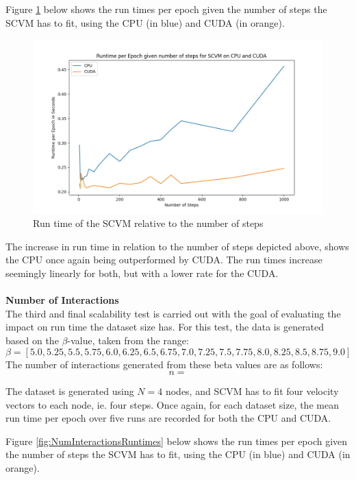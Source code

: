 Figure \ref{fig:NumStepsRuntimes} below shows the run times per epoch given the number of steps the SCVM has to fit, using the CPU (in blue) and CUDA (in orange).

\begin{figure}[H]
    \centering
    \includegraphics[width=\textwidth]{0_images/steps_runtime2.png}
    \caption{Run time of the SCVM relative to the number of steps}
    \label{fig:NumStepsRuntimes}
\end{figure}
The increase in run time in relation to the number of steps depicted above, shows the CPU once again being outperformed by CUDA.
The run times increase seemingly linearly for both, but with a lower rate for the CUDA.
\\\\
\textbf{Number of Interactions}
\\
The third and final scalability test is carried out with the goal of evaluating the impact on run time the dataset size has.
For this test, the data is generated based on the $\beta$-value, taken from the range:
\begin{equation}
    \beta = [5.0, 5.25, 5.5, 5.75, 6.0, 6.25, 6.5, 6.75, 7.0, 7.25, 7.5, 7.75, 8.0, 8.25, 8.5, 8.75, 9.0]
\end{equation}
The number of interactions generated from these beta values are as follows:
\begin{equation}
    n = 
\end{equation}

The dataset is generated using $N = 4$ nodes, and SCVM has to fit four velocity vectors to each node, ie. four steps.
Once again, for each dataset size, the mean run time per epoch over five runs are recorded for both the CPU and CUDA.

Figure \ref{fig:NumInteractionsRuntimes} below shows the run times per epoch given the number of steps the SCVM has to fit, using the CPU (in blue) and CUDA (in orange).

